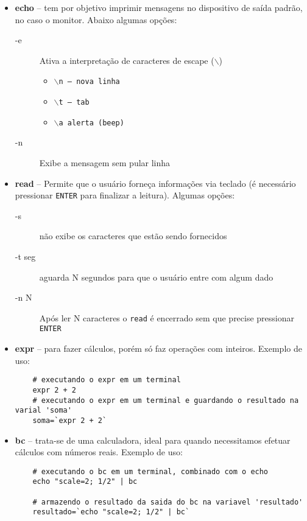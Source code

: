 \documentclass[11pt]{article}
\begin{document}
\begin{itemize}
	\item \textbf{echo} -- tem por objetivo imprimir mensagens no dispositivo de saída padrão, no caso o monitor. Abaixo algumas opções:
	\begin{description}
		\item[-e] Ativa a interpretação de caracteres de escape (\texttt{$\backslash$})
		\begin{itemize}
			\item $\backslash$\texttt{n -- nova linha}
			\item $\backslash$\texttt{t -- tab}
			\item $\backslash$\texttt{a alerta (beep)}
		\end{itemize}
		\item[-n] Exibe a mensagem sem pular linha
	\end{description}
	\item \textbf{read} -- Permite que o usuário forneça informações via teclado (é necessário pressionar \texttt{ENTER} para finalizar a leitura). Algumas opções:
	\begin{description}
		\item[-s] não exibe os caracteres que estão sendo fornecidos
		\item[-t seg] aguarda N segundos para que o usuário entre com algum dado
		\item[-n N] Após ler N caracteres o \texttt{read} é encerrado sem que precise pressionar \texttt{ENTER} 
	\end{description}
	\item \textbf{expr} -- para fazer cálculos, porém só faz operações com inteiros. Exemplo de uso: 
	\begin{lstlisting}
	# executando o expr em um terminal
	expr 2 + 2
	# executando o expr em um terminal e guardando o resultado na varial 'soma'
	soma=`expr 2 + 2`
\end{lstlisting}
	\item \textbf{bc} -- trata-se de uma calculadora, ideal para quando necessitamos efetuar cálculos com números reais. Exemplo de uso: 
	\begin{lstlisting}
	# executando o bc em um terminal, combinado com o echo
	echo "scale=2; 1/2" | bc

	# armazendo o resultado da saida do bc na variavel 'resultado'
	resultado=`echo "scale=2; 1/2" | bc`
\end{lstlisting}

\end{itemize}
\end{document}
